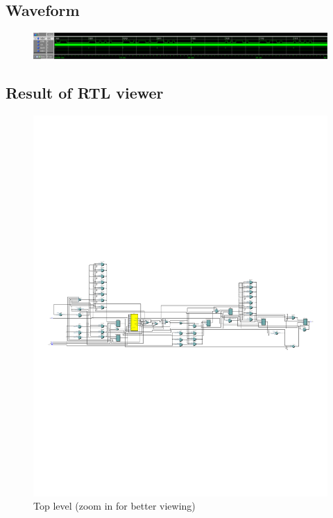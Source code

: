 \documentclass[13pt,a4paper]{report}
\begin{document}
\subsection{Waveform}
\begin{figure}[H]
\centering
\includegraphics[scale=0.38]{images/Exc4_waveform.png}
\end{figure}

\subsection{Result of RTL viewer}
\begin{figure}[H]
\centering
\includegraphics[scale=0.95, clip, trim={1cm 10.6cm 1cm 10.8cm}]{images/Exc4_RTL.pdf}
\caption*{Top level (zoom in for better viewing)}
\end{figure}
\end{document}
